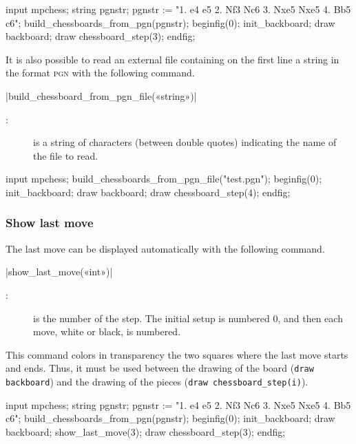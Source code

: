 \documentclass[english]{ltxdoc}
\begin{document}
\begin{ExempleMP}
input mpchess;
string pgnstr;
pgnstr := "1. e4 e5 2. Nf3 Nc6 3. Nxe5 Nxe5 4. Bb5 c6";
build_chessboards_from_pgn(pgnstr);
beginfig(0);
init_backboard;
draw backboard;
draw chessboard_step(3); %
endfig;
\end{ExempleMP}


It is also possible to read an external file containing on the first line a
string in the format \textsc{pgn} with the following command.

\commande|build_chessboard_from_pgn_file(«string»)|\smallskip

\begin{description}
  \item[:] is a string of characters (between double quotes)
  indicating the name of the file to read.  
\end{description}

\begin{ExempleMP}
input mpchess;
build_chessboards_from_pgn_file("test.pgn");
beginfig(0);
init_backboard;
draw backboard;
draw chessboard_step(4); %
endfig;
\end{ExempleMP}
\subsubsection{Show last move}

The last move can be displayed automatically with the following command.

\commande|show_last_move(«int»)|\smallskip

\begin{description}
\item[:] is the number of the step. The initial setup is numbered 0, and then each move, white or black, is numbered.
\end{description}

This command colors in transparency the two squares where the last move starts
and ends. Thus, it must be used between the drawing of the board
(\lstinline+draw backboard+) and the drawing of the pieces 
(\lstinline+draw chessboard_step(i)+).

\begin{ExempleMP}
input mpchess;
string pgnstr;
pgnstr := "1. e4 e5 2. Nf3 Nc6 3. Nxe5 Nxe5 4. Bb5 c6";
build_chessboards_from_pgn(pgnstr);
beginfig(0);
init_backboard;
draw backboard;
show_last_move(3);
draw chessboard_step(3); %
endfig;
\end{ExempleMP}
\end{document}

